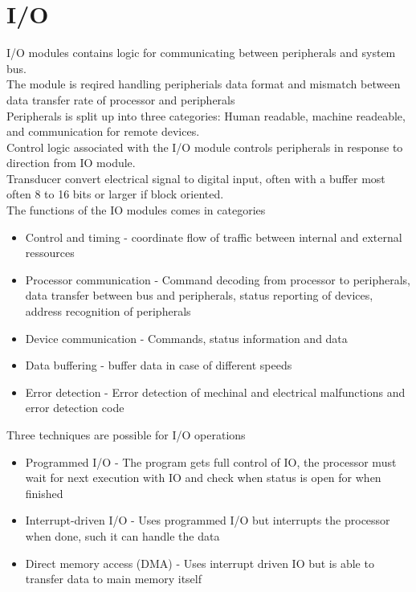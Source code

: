 \documentclass[12pt, a4paper]{article}
\begin{document}
	\section{I/O}
		I/O modules contains logic for communicating between peripherals and system bus.\\
		The module is reqired handling peripherials data format and mismatch between data transfer rate of processor and peripherals\\
		Peripherals is split up into three categories: Human readable, machine readeable, and communication for remote devices.\\
		Control logic associated with the I/O module controls peripherals in response to direction from IO module.\\
		Transducer convert electrical signal to digital input, often with a buffer most often 8 to 16 bits or larger if block oriented.\\
		The functions of the IO modules comes in categories
		\begin{itemize}
			\item Control and timing - coordinate flow of traffic between internal and external ressources
			\item Processor communication - Command decoding from processor to peripherals, data transfer between bus and peripherals, status reporting of devices, address recognition of peripherals
			\item Device communication - Commands, status information and data
			\item Data buffering - buffer data in case of different speeds
			\item Error detection - Error detection of mechinal and electrical malfunctions and error detection code
		\end{itemize}
		Three techniques are possible for I/O operations
		\begin{itemize}
			\item Programmed I/O - The program gets full control of IO, the processor must wait for next execution with IO and check when status is open for when finished
			\item Interrupt-driven I/O - Uses programmed I/O but interrupts the processor when done, such it can handle the data
			\item Direct memory access (DMA) - Uses interrupt driven IO but is able to transfer data to main memory itself
		\end{itemize}
\end{document}
